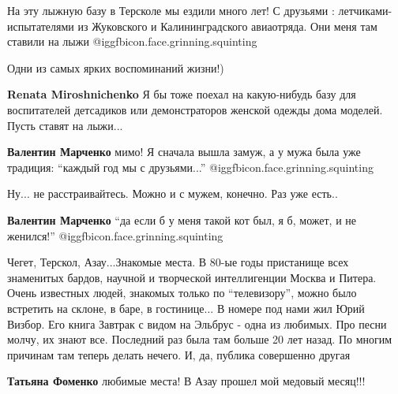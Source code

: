  
 
 
 
 
\zzSecCmt

\begin{itemize} %

На эту лыжную базу в Терсколе мы ездили много лет! С друзьями :
летчиками-испытателями из Жуковского и Калининградского авиаотряда. Они меня
там ставили на лыжи @igg{fbicon.face.grinning.squinting} 

Одни из самых ярких воспоминаний жизни!)

\begin{itemize} %
\textbf{Renata Miroshnichenko} Я бы тоже поехал на какую-нибудь базу для воспитателей детсадиков или демонстраторов женской одежды дома моделей. Пусть ставят на лыжи...

\textbf{Валентин Марченко} мимо! Я сначала вышла замуж, а у мужа была уже традиция: \enquote{каждый год мы с друзьями...} @igg{fbicon.face.grinning.squinting} 

Ну... не расстраивайтесь. Можно и с мужем, конечно. Раз уже есть..

\textbf{Валентин Марченко} \enquote{да если б у меня такой кот был, я б, может, и не женился!} @igg{fbicon.face.grinning.squinting} 
\end{itemize} %


Чегет, Терскол, Азау...Знакомые места. В 80-ые годы пристанище всех знаменитых
бардов, научной и творческой интеллигенции Москва и Питера. Очень известных
людей, знакомых только по \enquote{телевизору}, можно было встретить на склоне, в баре,
в гостинице... В номере под нами жил Юрий Визбор. Его книга Завтрак с видом на
Эльбрус - одна из любимых. Про песни молчу, их знают все. Последний раз была
там больше 20 лет назад. По многим причинам там теперь делать нечего. И, да,
публика совершенно другая

\begin{itemize} %
\textbf{Татьяна Фоменко} любимые места! В Азау прошел мой медовый месяц!!!


\end{itemize}
\end{itemize}

